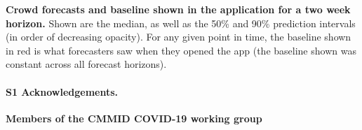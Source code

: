 \documentclass[10pt,letterpaper]{article}
\begin{document}
\textbf{Crowd forecasts and baseline shown in the application for a two week horizon.}
Shown are the median, as well as the 50\% and 90\% prediction intervals
(in order of decreasing opacity). For any given point in time, the
baseline shown in red is what forecasters saw when they opened the app
(the baseline shown was constant across all forecast horizons).

\paragraph*{S1 Acknowledgements.}

\textbf{Members of the CMMID COVID-19 working group}

\nolinenumbers
\end{document}
